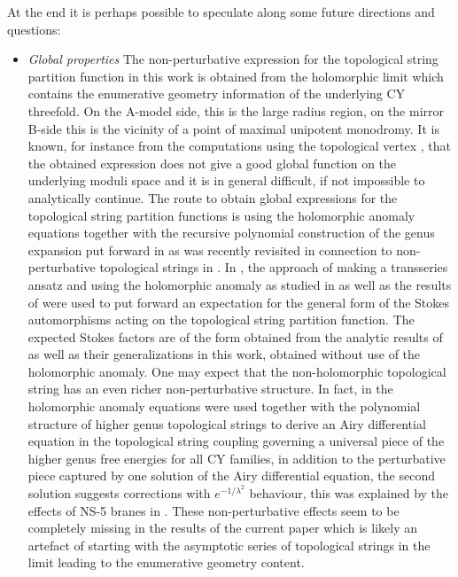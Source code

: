 \documentclass[a4paper,12pt,justification=centering]{article}
\numberwithin{equation}{section}
\theoremstyle{plain}%
\theoremstyle{definition}
\begin{document}
At the end it is perhaps possible to speculate along some future directions and questions:
\begin{itemize}

\item \emph{Global properties}
The non-perturbative expression for the topological string partition function in this work is obtained from the holomorphic limit which contains the enumerative geometry information of the underlying CY threefold. On the A-model side, this is the large radius region, on the mirror B-side this is the vicinity of a point of maximal unipotent monodromy. It is known, for instance from the computations using the topological vertex \cite{Aganagic:2003db}, that the obtained expression does not give a good global function on the underlying moduli space and it is in general difficult, if not impossible to analytically continue. The route to obtain global expressions for the topological string partition functions is using the holomorphic anomaly equations \cite{Bershadsky:1993cx} together with the recursive polynomial construction of the genus expansion put forward in \cite{Yamaguchi:2004bt,Alim:2007qj} as was recently revisited in connection to non-perturbative topological strings in \cite{Gu:2023mgf}. In \cite{Iwaki:2023cek}, the approach of making a transseries ansatz and using the holomorphic anomaly as studied in \cite{Couso-Santamaria:2013kmu,Couso-Santamaria:2014iia} as well as the results of \cite{IwakiPainleve,Gu:2022sqc,Gu:2023mgf} were used to put forward an expectation for the general form of the Stokes automorphisms acting on the topological string partition function. The expected Stokes factors are of the form obtained from the analytic results of \cite{Pasquetti:2009jg,Alim:2021mhp} as well as their generalizations in this work, obtained without use of the holomorphic anomaly. One may expect that the non-holomorphic topological string has an even richer non-perturbative structure. In fact, in \cite{Alim:2015qma} the holomorphic anomaly equations were used together with the polynomial structure of higher genus topological strings to derive an Airy differential equation in the topological string coupling governing a universal piece of the higher genus free energies for all CY families, in addition to the perturbative piece captured by one solution of the Airy differential equation, the second solution suggests corrections with $e^{-1/\lambda^2}$ behaviour, this was explained by the effects of NS-5 branes in \cite{Couso-Santamaria:2015hva}. These non-perturbative effects seem to be completely missing in the results of the current paper which is likely an artefact of starting with the asymptotic series of topological strings in the limit leading to the enumerative geometry content. 



\end{itemize}
\end{document}
